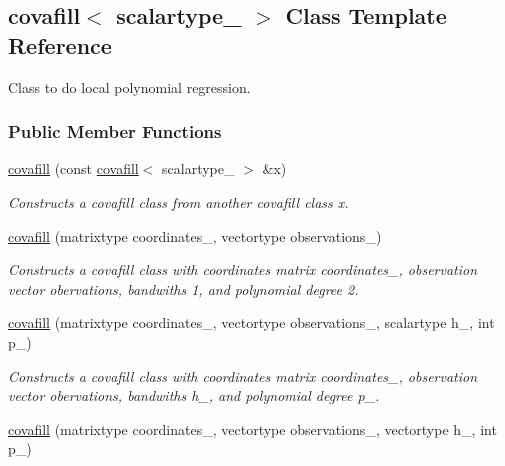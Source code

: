 \hypertarget{classcovafill}{}\subsection{covafill$<$ scalartype\+\_\+ $>$ Class Template Reference}
\label{classcovafill}


Class to do local polynomial regression.  


\subsubsection*{Public Member Functions}
\begin{DoxyCompactItemize}
\item 
\hypertarget{classcovafill_ad04c0d86b0bf096b3a38dd866523643a}{}\hyperlink{classcovafill_ad04c0d86b0bf096b3a38dd866523643a}{covafill} (const \hyperlink{classcovafill}{covafill}$<$ scalartype\+\_\+ $>$ \&x)\label{classcovafill_ad04c0d86b0bf096b3a38dd866523643a}

\begin{DoxyCompactList}\small\item\em Constructs a covafill class from another covafill class {\itshape x}. \end{DoxyCompactList}\item 
\hypertarget{classcovafill_ad270e8490cb357aa42df53e56477d3b0}{}\hyperlink{classcovafill_ad270e8490cb357aa42df53e56477d3b0}{covafill} (matrixtype coordinates\+\_\+, vectortype observations\+\_\+)\label{classcovafill_ad270e8490cb357aa42df53e56477d3b0}

\begin{DoxyCompactList}\small\item\em Constructs a covafill class with coordinates matrix {\itshape coordinates\+\_\+}, observation vector {\itshape obervations}, bandwiths 1, and polynomial degree 2. \end{DoxyCompactList}\item 
\hypertarget{classcovafill_acf5f5cbc366e8626d20872a972922093}{}\hyperlink{classcovafill_acf5f5cbc366e8626d20872a972922093}{covafill} (matrixtype coordinates\+\_\+, vectortype observations\+\_\+, scalartype h\+\_\+, int p\+\_\+)\label{classcovafill_acf5f5cbc366e8626d20872a972922093}

\begin{DoxyCompactList}\small\item\em Constructs a covafill class with coordinates matrix {\itshape coordinates\+\_\+}, observation vector {\itshape obervations}, bandwiths {\itshape h\+\_\+}, and polynomial degree {\itshape p\+\_\+}. \end{DoxyCompactList}\item 
\hypertarget{classcovafill_a7990c15b88e372938b258f9ffe67334e}{}\hyperlink{classcovafill_a7990c15b88e372938b258f9ffe67334e}{covafill} (matrixtype coordinates\+\_\+, vectortype observations\+\_\+, vectortype h\+\_\+, int p\+\_\+)\label{classcovafill_a7990c15b88e372938b258f9ffe67334e}


\end{DoxyCompactItemize}
